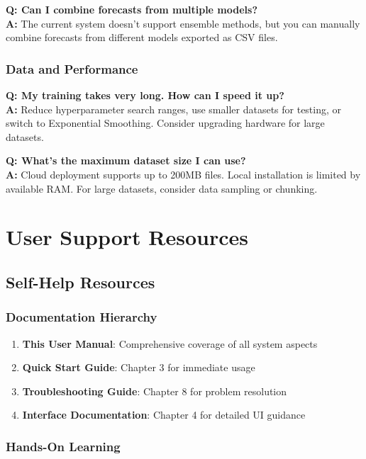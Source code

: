\textbf{Q: Can I combine forecasts from multiple models?}\\
\textbf{A:} The current system doesn't support ensemble methods, but you can manually combine forecasts from different models exported as CSV files.

\subsubsection{Data and Performance}

\textbf{Q: My training takes very long. How can I speed it up?}\\
\textbf{A:} Reduce hyperparameter search ranges, use smaller datasets for testing, or switch to Exponential Smoothing. Consider upgrading hardware for large datasets.

\textbf{Q: What's the maximum dataset size I can use?}\\
\textbf{A:} Cloud deployment supports up to 200MB files. Local installation is limited by available RAM. For large datasets, consider data sampling or chunking.

\section{User Support Resources}

\subsection{Self-Help Resources}

\subsubsection{Documentation Hierarchy}

\begin{enumerate}
    \item \textbf{This User Manual}: Comprehensive coverage of all system aspects
    \item \textbf{Quick Start Guide}: Chapter 3 for immediate usage
    \item \textbf{Troubleshooting Guide}: Chapter 8 for problem resolution
    \item \textbf{Interface Documentation}: Chapter 4 for detailed UI guidance
\end{enumerate}

\subsubsection{Hands-On Learning}

